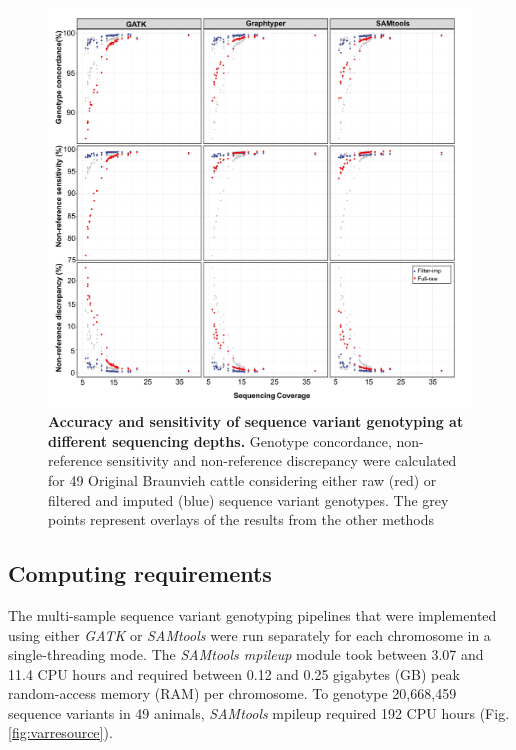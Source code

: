 \documentclass[../main.tex]{subfiles}
\begin{document}
\begin{figure}[!htb]
    \centering
    \includegraphics[width=\textwidth]{paper1/main_figure/Figure3.pdf}
    \caption[Accuracy and sensitivity of sequence variant genotyping at different sequencing depths]{\textbf{Accuracy and sensitivity of sequence variant genotyping at different sequencing depths.} Genotype concordance, non-reference sensitivity and non-reference discrepancy were calculated for 49 Original Braunvieh cattle considering either raw (red) or filtered and imputed (blue) sequence variant genotypes. The grey points represent overlays of the results from the other methods}
    \label{fig:varimpute}
\end{figure}

\subsection*{Computing requirements}

The multi-sample sequence variant genotyping pipelines that were implemented using either \emph{GATK} or \emph{SAMtools} were run separately for each chromosome in a single-threading mode. 
The \emph{SAMtools mpileup} module took between 3.07 and 11.4 CPU hours and required between 0.12 and 0.25 gigabytes (GB) peak random-access memory (RAM) per chromosome. 
To genotype 20,668,459 sequence variants in 49 animals, \emph{SAMtools} mpileup required 192 CPU hours (Fig. \ref{fig:varresource}).
\end{document}
